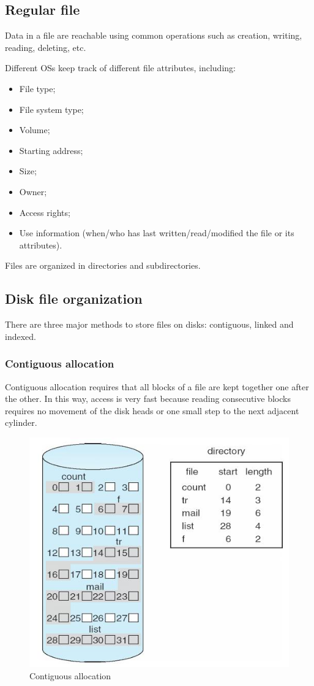 \documentclass{report}
\begin{document}
\subsection{Regular file}
Data in a file are reachable using common operations such as creation, writing, reading, deleting, etc.

Different OSs keep track of different file attributes, including:
\begin{itemize}
\item File type;
\item File system type;
\item Volume;
\item Starting address;
\item Size;
\item Owner;
\item Access rights;
\item Use information (when/who has last written/read/modified the file or its attributes).
\end{itemize}
Files are organized in directories and subdirectories.

\subsection{Disk file organization}
There are three major methods to store files on disks: contiguous, linked and indexed.

\subsubsection{Contiguous allocation}
Contiguous allocation requires that all blocks of a file are kept together one after the other. In this way, access is very fast because reading consecutive blocks requires no movement of the disk heads or one small step to the next adjacent cylinder.

\begin{figure}[hbtp]
\centering
\includegraphics[scale=0.35]{images/file_system/contiguous_allocation.png}
\caption{Contiguous allocation}
\end{figure}
\end{document}
